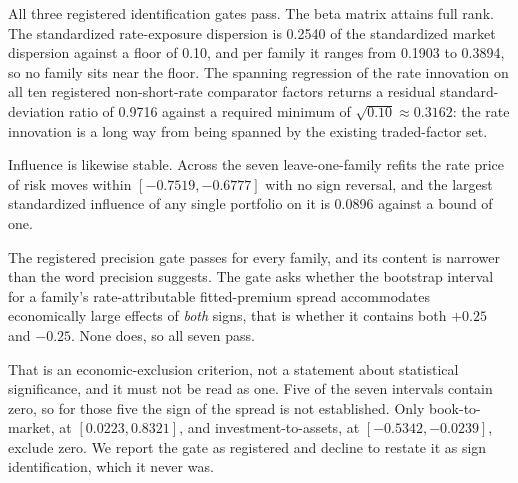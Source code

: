 \documentclass[11pt]{article}
\begin{document}
All three registered identification gates pass. The beta matrix attains full rank. The
standardized rate-exposure dispersion is 0.2540 of the standardized market %
dispersion against a floor of 0.10, and per family it ranges from 0.1903 to %
0.3894, so no family sits near the floor. %
The spanning regression of the rate innovation on all ten registered
non-short-rate comparator factors returns a residual standard-deviation ratio of
0.9716 against a required minimum of $\sqrt{0.10} \approx 0.3162$: the rate %
innovation is a long way from being spanned by the existing traded-factor set. %

Influence is likewise stable. Across the seven leave-one-family refits the rate
price of risk moves within $[-0.7519, -0.6777]$ with no sign reversal, and the %
largest standardized influence of any single portfolio on it is 0.0896 against a %
bound of one. %

The registered precision gate passes for every family, and its content is
narrower than the word precision suggests. The gate asks whether the bootstrap
interval for a family's rate-attributable fitted-premium spread accommodates
economically large effects of \emph{both} signs, that is whether it contains
both $+0.25$ and $-0.25$. None does, so all seven pass. %

That is an economic-exclusion criterion, not a statement about statistical
significance, and it must not be read as one. Five of the seven intervals
contain zero, so for those five the sign of the spread is not established. Only
book-to-market, at $[0.0223, 0.8321]$, and investment-to-assets, at %
$[-0.5342, -0.0239]$, exclude zero. %
We report the gate as registered and decline to restate it as sign
identification, which it never was.
\end{document}
